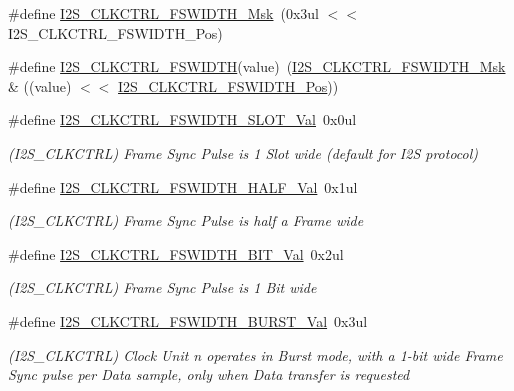 \begin{DoxyCompactItemize}
\#define \mbox{\hyperlink{group___s_a_m_d21___i2_s_ga85d46e1c158ee5b634e1e97a3609a0d4}{I2\+S\+\_\+\+C\+L\+K\+C\+T\+R\+L\+\_\+\+F\+S\+W\+I\+D\+T\+H\+\_\+\+Msk}}~(0x3ul $<$$<$ I2\+S\+\_\+\+C\+L\+K\+C\+T\+R\+L\+\_\+\+F\+S\+W\+I\+D\+T\+H\+\_\+\+Pos)
\item 
\#define \mbox{\hyperlink{group___s_a_m_d21___i2_s_gaa94679ae6bdcb5fb23330c37a55f8305}{I2\+S\+\_\+\+C\+L\+K\+C\+T\+R\+L\+\_\+\+F\+S\+W\+I\+D\+TH}}(value)~(\mbox{\hyperlink{group___s_a_m_d21___i2_s_ga85d46e1c158ee5b634e1e97a3609a0d4}{I2\+S\+\_\+\+C\+L\+K\+C\+T\+R\+L\+\_\+\+F\+S\+W\+I\+D\+T\+H\+\_\+\+Msk}} \& ((value) $<$$<$ \mbox{\hyperlink{group___s_a_m_d21___i2_s_ga68fd7a78e998d738a74bf6a56a47a082}{I2\+S\+\_\+\+C\+L\+K\+C\+T\+R\+L\+\_\+\+F\+S\+W\+I\+D\+T\+H\+\_\+\+Pos}}))
\item 
\#define \mbox{\hyperlink{group___s_a_m_d21___i2_s_ga95aeb939939817f4a06c2b7fad0baf11}{I2\+S\+\_\+\+C\+L\+K\+C\+T\+R\+L\+\_\+\+F\+S\+W\+I\+D\+T\+H\+\_\+\+S\+L\+O\+T\+\_\+\+Val}}~0x0ul
\begin{DoxyCompactList}\small\item\em (I2\+S\+\_\+\+C\+L\+K\+C\+T\+RL) Frame Sync Pulse is 1 Slot wide (default for I2S protocol) \end{DoxyCompactList}\item 
\#define \mbox{\hyperlink{group___s_a_m_d21___i2_s_ga74f044f2df267ca85a29fea55b94cd7b}{I2\+S\+\_\+\+C\+L\+K\+C\+T\+R\+L\+\_\+\+F\+S\+W\+I\+D\+T\+H\+\_\+\+H\+A\+L\+F\+\_\+\+Val}}~0x1ul
\begin{DoxyCompactList}\small\item\em (I2\+S\+\_\+\+C\+L\+K\+C\+T\+RL) Frame Sync Pulse is half a Frame wide \end{DoxyCompactList}\item 
\#define \mbox{\hyperlink{group___s_a_m_d21___i2_s_ga8e586922105865e834930dfc922c1671}{I2\+S\+\_\+\+C\+L\+K\+C\+T\+R\+L\+\_\+\+F\+S\+W\+I\+D\+T\+H\+\_\+\+B\+I\+T\+\_\+\+Val}}~0x2ul
\begin{DoxyCompactList}\small\item\em (I2\+S\+\_\+\+C\+L\+K\+C\+T\+RL) Frame Sync Pulse is 1 Bit wide \end{DoxyCompactList}\item 
\#define \mbox{\hyperlink{group___s_a_m_d21___i2_s_gad8a9cb5d05e25833a45f099860ac162e}{I2\+S\+\_\+\+C\+L\+K\+C\+T\+R\+L\+\_\+\+F\+S\+W\+I\+D\+T\+H\+\_\+\+B\+U\+R\+S\+T\+\_\+\+Val}}~0x3ul
\begin{DoxyCompactList}\small\item\em (I2\+S\+\_\+\+C\+L\+K\+C\+T\+RL) Clock Unit n operates in Burst mode, with a 1-\/bit wide Frame Sync pulse per Data sample, only when Data transfer is requested \end{DoxyCompactList}\item 

\end{DoxyCompactItemize}
